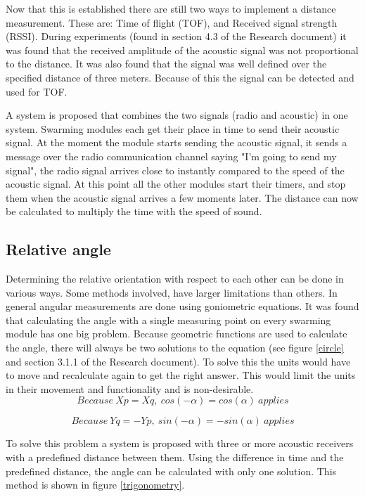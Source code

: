 \documentclass[10pt,a4paper]{article}
\begin{document}
Now that this is established there are still two ways to implement a distance measurement. These are: Time of flight (TOF)\cite{TOF}, and Received signal strength (RSSI)\cite{RSSI}. During experiments (found in section 4.3 of the Research document) it was found that the received amplitude of the acoustic signal was not proportional to the distance. It was also found that the signal was well defined over the specified distance of three meters. Because of this the signal can be detected and used for TOF.

A system is proposed that combines the two signals (radio and acoustic) in one system. Swarming modules each get their place in time to send their acoustic signal. At the moment the module starts sending the acoustic signal, it sends a message over the radio communication channel saying "I'm going to send my signal", the radio signal arrives close to instantly compared to the speed of the acoustic signal. At this point all the other modules start their timers, and stop them when the acoustic signal arrives a few moments later. The distance can now be calculated to multiply the time with the speed of sound.


\subsection{Relative angle}
Determining the relative orientation with respect to each other can be done in various ways. Some methods involved, have larger limitations than others. In general angular measurements are done using goniometric equations. It was found that calculating the angle with a single measuring point on every swarming module has one big problem\cite{Angle}. Because geometric functions are used to calculate the angle, there will always be two solutions to the equation (see figure \ref{circle} and section 3.1.1 of the Research document). To solve this the units would have to move and recalculate again to get the right answer. This would limit the units in their movement and functionality and is non-desirable.
\begin{equation}
Because\ Xp = Xq,\ cos(-\alpha) = cos(\alpha)\ applies
\end{equation}

\begin{equation}
Because\ Yq = -Yp,\ sin(-\alpha) = -sin(\alpha)\ applies
\end{equation}


To solve this problem a system is proposed with three or more acoustic receivers with a predefined distance between them. Using the difference in time and the predefined distance, the angle can be calculated with only one solution. This method is shown in figure \ref{trigonometry}.
\end{document}
